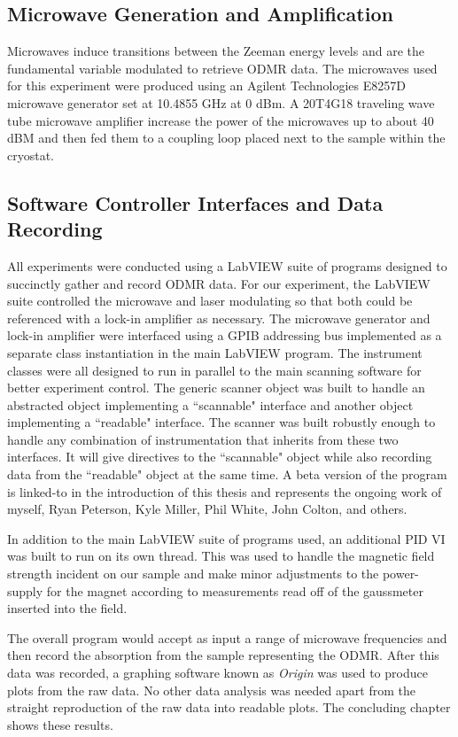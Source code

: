 \documentclass[oneside, astronomy, noacknowlegments]{BYUPhys}
\begin{document}
\subsection{Microwave Generation and Amplification}

Microwaves induce transitions between the Zeeman energy levels and are the fundamental variable modulated to retrieve ODMR data. The microwaves used for this experiment were produced using an Agilent Technologies E8257D microwave generator set at 10.4855 GHz at 0 dBm. A 20T4G18 traveling wave tube microwave amplifier increase the power of the microwaves up to about 40 dBM and then fed them to a coupling loop placed next to the sample within the cryostat.

\subsection{Software Controller Interfaces and Data Recording}

All experiments were conducted using a LabVIEW suite of programs designed to succinctly gather and record ODMR data. For our experiment, the LabVIEW suite controlled the microwave and laser modulating so that both could be referenced with a lock-in amplifier as necessary. The microwave generator and lock-in amplifier were interfaced using a GPIB addressing bus implemented as a separate class instantiation in the main LabVIEW program. The instrument classes were all designed to run in parallel to the main scanning software for better experiment control. The generic scanner object was built to handle an abstracted object implementing a ``scannable" interface and another object implementing a ``readable" interface. The scanner was built robustly enough to handle any combination of instrumentation that inherits from these two interfaces. It will give directives to the ``scannable" object while also recording data from the ``readable" object at the same time. A beta version of the program is linked-to in the introduction of this thesis and represents the ongoing work of myself, Ryan Peterson, Kyle Miller, Phil White, John Colton, and others.

In addition to the main LabVIEW suite of programs used, an additional PID VI was built to run on its own thread. This was used to handle the magnetic field strength incident on our sample and make minor adjustments to the power-supply for the magnet according to measurements read off of the gaussmeter inserted into the field.

The overall program would accept as input a range of microwave frequencies and then record the absorption from the sample representing the ODMR. After this data was recorded, a graphing software known as \textit{Origin} was used to produce plots from the raw data. No other data analysis was needed apart from the straight reproduction of the raw data into readable plots. The concluding chapter shows these results.
\end{document}
